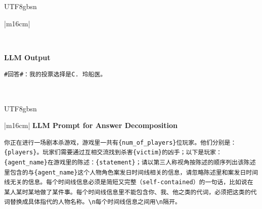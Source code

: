 \documentclass[11pt]{article}
\begin{document}
{\begin{CJK}{UTF8}{gbsn}
\begin{table}[ht!]
\begin{tabular}{|m{16cm}|}
\begin{minipage}[t]{\linewidth}
\begin{verbatim}
\end{verbatim}
\end{minipage} \\
\hline
{}  \textbf{LLM Output}  \\
\hline
\begin{minipage}[t]{\linewidth}
\small\begin{verbatim}
#回答#：我的投票选择是C. 玲船医。

\end{verbatim}
\end{minipage} \\
\hline
\end{tabular}
\caption{LLM prompt and output for murderer identification.}
\label{table:prompt_murderer_identification_cn}
\end{table}
\end{CJK}


\begin{CJK}{UTF8}{gbsn}
\begin{table}[ht!]
\centering
\begin{tabular}{|m{16cm}|}
\hline
{}  {\textbf{LLM Prompt for Answer Decomposition}} \\
\begin{minipage}[t]{\linewidth}
\small\begin{verbatim}
你正在进行一场剧本杀游戏，游戏里一共有{num_of_players}位玩家。他们分别是：{players}。玩家们需要通过互相交流找到杀害{victim}的凶手；以下是玩家：{agent_name}在游戏里的陈述：{statement}；请以第三人称视角按陈述的顺序列出该陈述里包含的与{agent_name}这个人物角色案发日时间线相关的信息，请忽略陈述里和案发日时间线无关的信息。每个时间线信息必须是简短又完整（self-contained）的一句话，比如说在某人某时某地做了某件事。每个时间线信息里不能包含你、我、他之类的代词，必须把这类的代词替换成具体指代的人物名称。\n每个时间线信息之间用\n隔开。


\end{verbatim}
\end{minipage}
\end{tabular}
\end{table}
\end{CJK}}
\end{document}
